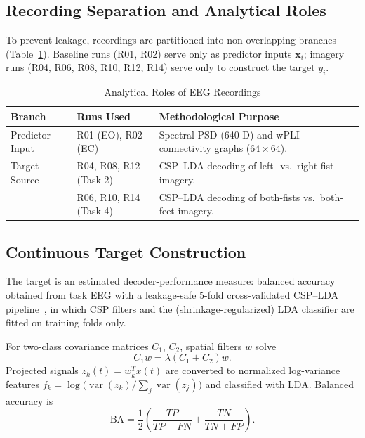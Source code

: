 \documentclass{ieeeaccess}
\begin{document}
\subsection{Recording Separation and Analytical Roles}

To prevent leakage, recordings are partitioned into non-overlapping branches (Table~\ref{tab:data_roles}). Baseline runs (R01, R02) serve only as predictor inputs $\mathbf{x}_i$; imagery runs (R04, R06, R08, R10, R12, R14) serve only to construct the target $y_i$.

\begin{table}[!t]
\caption{Analytical Roles of EEG Recordings}
\label{tab:data_roles}
\centering
\small
\begin{tabular}{p{1.35cm}p{1.8cm}p{3.0cm}}
\toprule
\textbf{Branch} & \textbf{Runs Used} & \textbf{Methodological Purpose}\\
\midrule
Predictor Input & R01 (EO), R02 (EC) & Spectral PSD (640-D) and wPLI connectivity graphs ($64\times64$).\\
Target Source & R04, R08, R12 (Task 2) & CSP--LDA decoding of left- vs.\ right-fist imagery.\\
& R06, R10, R14 (Task 4) & CSP--LDA decoding of both-fists vs.\ both-feet imagery.\\
\bottomrule
\end{tabular}
\end{table}

\subsection{Continuous Target Construction}

The target is an estimated decoder-performance measure: balanced accuracy obtained from task EEG with a leakage-safe 5-fold cross-validated CSP--LDA pipeline~\cite{ramoser2000,ang2012}, in which CSP filters and the (shrinkage-regularized) LDA classifier are fitted on training folds only.

For two-class covariance matrices $C_1$, $C_2$, spatial filters $w$ solve
\begin{equation}
C_1 w = \lambda (C_1 + C_2) w .
\end{equation}
Projected signals $z_k(t)=w_k^T x(t)$ are converted to normalized log-variance features $f_k=\log\bigl(\operatorname{var}(z_k)/\sum_j \operatorname{var}(z_j)\bigr)$ and classified with LDA. Balanced accuracy is
\begin{equation}
\mathrm{BA} = \frac{1}{2} \left( \frac{TP}{TP + FN} + \frac{TN}{TN + FP} \right).
\end{equation}
\end{document}
